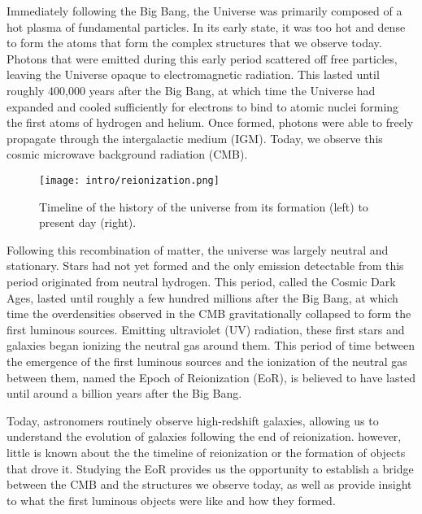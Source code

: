 Immediately following the Big Bang, the Universe was primarily composed of a hot plasma of fundamental particles. In its early state, it was  too hot and dense to form the atoms that form the complex structures that we observe today. Photons that were emitted during this early period scattered off free particles, leaving the Universe opaque to electromagnetic radiation. This lasted until roughly 400,000 years after the Big Bang, at which time the Universe had expanded and cooled sufficiently for electrons to bind to atomic nuclei forming the first atoms of hydrogen and helium. Once formed, photons were able to freely propagate through the intergalactic medium (IGM). Today, we observe this cosmic microwave background radiation (CMB).

\begin{figure}[th]
	\centering
	\texttt{[image: intro/reionization.png]}
	\caption[Epoch of Reionization Timeline]{Timeline of the history of the universe from its formation (left) to present day (right).}
	\label{fig:timeline}
\end{figure}

Following this recombination of matter, the universe was largely neutral and stationary.
Stars had not yet formed and the only emission detectable from this period originated
from neutral hydrogen. This period, called the Cosmic Dark Ages, lasted until roughly a few hundred millions after the Big Bang,
at which time the overdensities observed in the CMB gravitationally collapsed to form the first luminous sources.
Emitting ultraviolet (UV) radiation, these first stars and galaxies began ionizing
the neutral gas around them. This period of time between the emergence of the first luminous sources and the
ionization of the neutral gas between them, named the Epoch of Reionization (EoR),
is believed to have lasted until around a billion years after the Big Bang.

Today, astronomers routinely observe high-redshift galaxies, allowing us to understand
the evolution of galaxies following the end of reionization. however, little is known
about the the timeline of reionization or the formation of objects that drove it.
Studying the EoR provides us the opportunity to establish a
bridge between the CMB and the structures we observe today, as well as provide
insight to what the first luminous objects were like and how they formed.
